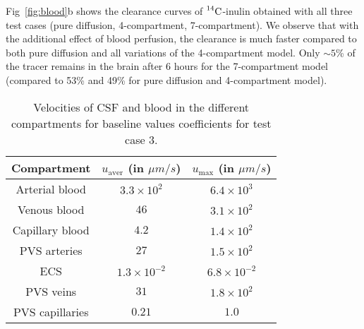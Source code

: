 \documentclass[10pt]{article}
\newcommand{\1}{^{(1)}}
\newcommand{\2}{^{(2)}}
\newcommand{\Cinulin}{$\prescript{14}{}{\text{C}}$-inulin }
\providecommand{\DIFaddtex}[1]{{\protect\color{blue}\uwave{#1}}} %
\providecommand{\DIFdeltex}[1]{{\protect\color{red}\sout{#1}}}                      %
\providecommand{\DIFaddFL}[1]{\DIFadd{#1}} %
\providecommand{\DIFdelFL}[1]{\DIFdel{#1}} %
\providecommand{\DIFaddbeginFL}{} %
\providecommand{\DIFaddendFL}{} %
\providecommand{\DIFdelbeginFL}{} %
\providecommand{\DIFdelendFL}{} %
\providecommand{\DIFadd}[1]{\texorpdfstring{\DIFaddtex{#1}}{#1}} %
\providecommand{\DIFdel}[1]{\texorpdfstring{\DIFdeltex{#1}}{}} %
\newcommand{\DIFscaledelfig}{0.5}
\newlength{\DIFdelgraphicswidth} %
\newlength{\DIFdelgraphicsheight} %
\newcommand{\DIFaddincludegraphics}[2][]{{\color{blue}\fbox{\DIFOincludegraphics[#1]{#2}}}} %
\newcommand{\DIFdelincludegraphics}[2][]{%
\sbox{\DIFdelgraphicsbox}{\DIFOincludegraphics[#1]{#2}}%
\settoboxwidth{\DIFdelgraphicswidth}{\DIFdelgraphicsbox} %
\settoboxtotalheight{\DIFdelgraphicsheight}{\DIFdelgraphicsbox} %
\scalebox{\DIFscaledelfig}{%
\parbox[b]{\DIFdelgraphicswidth}{\usebox{\DIFdelgraphicsbox}\\[-\baselineskip] \rule{\DIFdelgraphicswidth}{0em}}\llap{\resizebox{\DIFdelgraphicswidth}{\DIFdelgraphicsheight}{%
\setlength{\unitlength}{\DIFdelgraphicswidth}%
\begin{picture}(1,1)%
\thicklines\linethickness{2pt} %
{\color[rgb]{1,0,0}\put(0,0){\framebox(1,1){}}}%
{\color[rgb]{1,0,0}\put(0,0){\line( 1,1){1}}}%
{\color[rgb]{1,0,0}\put(0,1){\line(1,-1){1}}}%
\end{picture}%
}\hspace*{3pt}}} %
} %
\DeclareRobustCommand{\DIFaddbeginFL}{\DIFOaddbeginFL \let\includegraphics\DIFaddincludegraphics} %
\DeclareRobustCommand{\DIFaddendFL}{\DIFOaddendFL \let\includegraphics\DIFOincludegraphics} %
\DeclareRobustCommand{\DIFdelbeginFL}{\DIFOdelbeginFL \let\includegraphics\DIFdelincludegraphics} %
\DeclareRobustCommand{\DIFdelendFL}{\DIFOaddendFL \let\includegraphics\DIFOincludegraphics} %
\begin{document}
Fig~\ref{fig:blood}b shows the clearance curves of \Cinulin obtained with all three test cases (pure diffusion, 4-compartment, 7-compartment). 
We observe that with the additional effect of blood perfusion, the clearance is much faster compared to both pure diffusion and all variations of the 4-compartment model. Only $\sim 5$\% of the tracer remains in the brain after 6 hours for the 7-compartment model (compared to 53\% and 49\% for pure diffusion and 4-compartment model). 

\begin{table}[h!]
    \centering
    \begin{tabular}{c|c|c}
       Compartment & $u_\text{aver}$ (in $\si{\mu m/s}$) & $u_\text{max}$ (in $\si{\mu m/s}$) \\
       \hline
        Arterial blood & \DIFdelbeginFL \DIFdelFL{$3.3 \times 10^2$ }\DIFdelendFL \DIFaddbeginFL \DIFaddFL{$4.1 \times 10^3$ }\DIFaddendFL & \DIFdelbeginFL \DIFdelFL{$6.4 \times 10^3$}\DIFdelendFL \DIFaddbeginFL \DIFaddFL{$72 \times 10^3$}\DIFaddendFL \\
        Venous blood & \DIFdelbeginFL \DIFdelFL{$46$ }\DIFdelendFL \DIFaddbeginFL \DIFaddFL{$58 \times 10^2$ }\DIFaddendFL & \DIFdelbeginFL \DIFdelFL{$3.1 \times 10^2$ }\DIFdelendFL \DIFaddbeginFL \DIFaddFL{$3.7 \times 10^3$ }\DIFaddendFL \\
        Capillary blood & \DIFdelbeginFL \DIFdelFL{$4.2$ }\DIFdelendFL \DIFaddbeginFL \DIFaddFL{$0.48$ }\DIFaddendFL & \DIFdelbeginFL \DIFdelFL{$1.4 \times 10^2$}\DIFdelendFL \DIFaddbeginFL \DIFaddFL{$9.0$}\DIFaddendFL \\
        PVS arteries & $27$ & $1.5 \times 10^2$ \\
        ECS &  \DIFdelbeginFL \DIFdelFL{$1.3 \times 10^{-2}$ }\DIFdelendFL \DIFaddbeginFL \DIFaddFL{$3.9 \times 10^{-3}$ }\DIFaddendFL & \DIFdelbeginFL \DIFdelFL{$6.8 \times 10^{-2} $ }\DIFdelendFL \DIFaddbeginFL \DIFaddFL{$ 6.9  \times 10^{-2} $ }\DIFaddendFL \\
        PVS veins & \DIFdelbeginFL \DIFdelFL{$31$ }\DIFdelendFL \DIFaddbeginFL \DIFaddFL{$.$ }\DIFaddendFL & $1.8\times 10^2$ \\
        PVS capillaries & $0.21$ & $1.0$
    \end{tabular}
    \caption{Velocities of CSF and blood in the different compartments for baseline values coefficients for test case 3.}
    \label{tab:velocities-withblood}
\end{table}
\end{document}
